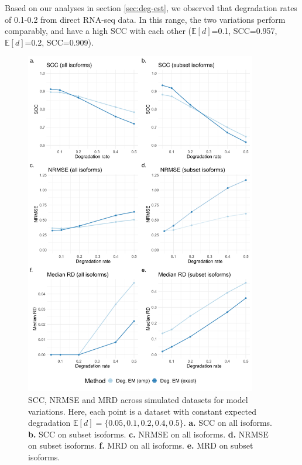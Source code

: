Based on our analyses in section \ref{sec:deg-est}, we observed that degradation rates of 0.1-0.2 from direct RNA-seq data. In this range, the two variations perform comparably, and have a high SCC with each other ($\mathbb{E}[d]$=0.1, SCC=0.957, $\mathbb{E}[d]$=0.2, SCC=0.909).  

\begin{figure}[H]
    \centering
    \includegraphics[width=0.9\textwidth]{figures/sec-4-1-scc-nrmse.png}
    \caption[SCC, NRMSE and MRD across simulated datasets for model variations]{SCC, NRMSE and MRD across simulated datasets for model variations. Here, each point is a dataset with constant expected degradation $\mathbb{E}[d]=\{0.05,0.1,0.2,0.4,0.5\}$. \textbf{a.} SCC on all isoforms. \textbf{b.} SCC on subset isoforms. \textbf{c.} NRMSE on all isoforms. \textbf{d.} NRMSE on subset isoforms. \textbf{f.} MRD on all isoforms. \textbf{e.} MRD on subset isoforms.}
    \label{fig:4-1-scc-nrmse}
\end{figure}

